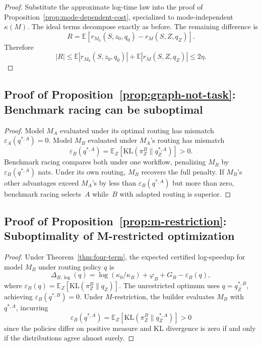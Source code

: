 \documentclass[10pt]{article}
\theoremstyle{paperplain}
\theoremstyle{paperdefinition}
\theoremstyle{paperremark}
\newcommand{\KL}{\mathrm{KL}}
\newcommand{\E}{\mathbb{E}}
\begin{document}
\begin{proof}
Substitute the approximate log-time law into the proof of Proposition~\ref{prop:mode-dependent-cost}, specialized to mode-independent $\kappa(M)$. The ideal terms decompose exactly as before. The remaining difference is
\[
R=\E[r_{M_0}(S,z_0,q_0)-r_M(S,Z,q_Z)].
\]
Therefore
\[
|R|\le \E|r_{M_0}(S,z_0,q_0)|+\E|r_M(S,Z,q_Z)|\le 2\eta.
\]
\end{proof}

\subsection{Proof of Proposition~\ref{prop:graph-not-task}: Benchmark racing can be suboptimal}
\label{app:proof:prop:graph-not-task}

\begin{proof}
Model $M_A$ evaluated under its optimal routing has mismatch $\varepsilon_A(q^{*,A}) = 0$.
Model $M_B$ evaluated under $M_A$'s routing has mismatch
\[
\varepsilon_B(q^{*,A}) = \E_Z[\KL(\pi^B_Z \| q^{*,A}_Z)] > 0.
\]
Benchmark racing compares both under one workflow, penalizing $M_B$ by $\varepsilon_B(q^{*,A})$ nats.
Under its own routing, $M_B$ recovers the full penalty.
If $M_B$'s other advantages exceed $M_A$'s by less than $\varepsilon_B(q^{*,A})$ but more than zero, benchmark racing selects~$A$ while~$B$ with adapted routing is superior.
\end{proof}

\subsection{Proof of Proposition~\ref{prop:m-restriction}: Suboptimality of M-restricted optimization}
\label{app:proof:prop:m-restriction}

\begin{proof}
Under Theorem~\ref{thm:four-term}, the expected certified log-speedup for model $M_B$ under routing policy $q$ is
\[
\Delta_{B,\log}(q) = \log(\kappa_0/\kappa_B) + \varphi_B + G_B - \varepsilon_B(q),
\]
where $\varepsilon_B(q) = \E_Z[\KL(\pi^B_Z \| q_Z)]$.
The unrestricted optimum uses $q = q^{*,B}_Z$, achieving $\varepsilon_B(q^{*,B}) = 0$.
Under $M$-restriction, the builder evaluates $M_B$ with $q^{*,A}$, incurring
\[
\varepsilon_B(q^{*,A}) = \E_Z[\KL(\pi^B_Z \| q^{*,A}_Z)] > 0
\]
since the policies differ on positive measure and KL divergence is zero if and only if the distributions agree almost surely.
\end{proof}
\end{document}
